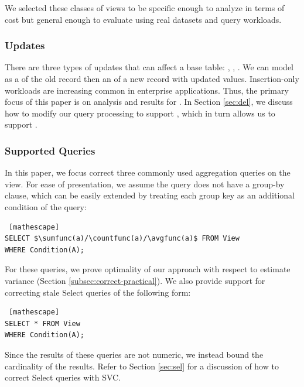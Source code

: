 \vspace{0.25em}

We selected these classes of views to be specific enough to analyze in terms of cost but general enough to evaluate using real datasets and query workloads.

\subsubsection{Updates}
There are three types of updates that can affect a base table: \insertion, \delete, \update.
We can model \update as a \delete of the old record then an \insertion of a new record with updated values. 
Insertion-only workloads are increasing common \cite{grund2009vertical} in enterprise applications.
Thus, the primary focus of this paper is on analysis and results for \insertion. In Section \ref{sec:del}, we discuss how to modify our query processing to support \delete, which in turn allows us to support \update.

\subsubsection{Supported Queries} \label{subsubsec:queries}
In this paper, we focus correct three commonly used aggregation queries on the view.
For ease of presentation, we assume the query does not have a group-by clause, which can be easily extended by treating each group key as an additional condition of the query: 
\begin{lstlisting} [mathescape]
SELECT $\sumfunc(a)/\countfunc(a)/\avgfunc(a)$ FROM View 
WHERE Condition(A);
\end{lstlisting}
For these queries, we prove optimality of our approach with respect to estimate variance (Section \ref{subsec:correct-practical}). 
We also provide support for correcting stale Select queries of the following form:
\begin{lstlisting} [mathescape]
SELECT * FROM View 
WHERE Condition(A);
\end{lstlisting}
Since the results of these queries are not numeric, we instead bound the cardinality of the results.
Refer to Section \ref{sec:sel} for a discussion of how to correct Select queries with SVC. 



